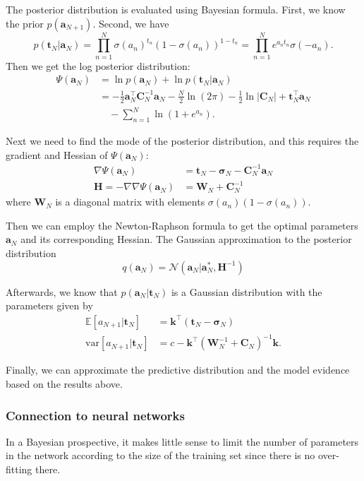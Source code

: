 \documentclass[a4paper]{report}
\newcommand{\up}{\mathrm}
\renewcommand{\bf}{\mathbf}
\renewcommand{\cal}{\mathcal}
\newcommand{\bb}{\mathbb}
\newcommand{\bs}{\boldsymbol}
\begin{document}
The posterior distribution is evaluated using Bayesian formula. First, we know the prior $p(\bf{a}_{N+1})$. Second, we have
\begin{equation}
	p(\bf{t}_N|\bf{a}_N) = \prod_{n=1}^N \sigma(a_n)^{t_n} (1-\sigma(a_n))^{1-t_n} = \prod_{n=1}^N e^{a_n t_n}\sigma(-a_n).
\end{equation}
Then we get the log posterior distribution:
\begin{align}
	\Psi(\bf{a}_N) &= \ln p(\bf{a}_N) + \ln p(\bf{t}_N|\bf{a}_N) \\
	&= -\frac{1}{2} \bf{a}_N^{\intercal} \bf{C}_N^{-1} \bf{a}_N - \frac{N}{2} \ln (2\pi) - \frac{1}{2} \ln |\bf{C}_N| + \bf{t}_N^{\intercal}\bf{a}_N \\
	&\quad  -\sum_{n=1}^N \ln (1+e^{a_n}).
\end{align}

Next we need to find the mode of the posterior distribution, and this requires the gradient and Hessian of $\Psi(\bf{a}_N)$:
\begin{align}
	\nabla \Psi(\bf{a}_N) &= \bf{t}_N - \bs{\sigma}_N - \bf{C}_N^{-1} \bf{a}_N \\
    \bf{H} = -\nabla\nabla \Psi(\bf{a}_N) &=  \bf{W}_N + \bf{C}_N^{-1}
\end{align}
where $\bf{W}_N$ is a diagonal matrix with elements $\sigma(a_n)(1-\sigma(a_n))$.

Then we can employ the Newton-Raphson formula to get the optimal parameters $\bf{a}_N$ and its corresponding Hessian. The Gaussian approximation to the posterior distribution
\begin{equation}
	q(\bf{a}_N) = \cal{N}(\bf{a}_N|\bf{a}_N^*,\bf{H}^{-1})
\end{equation}

Afterwards, we know that $p(\bf{a}_N|\bf{t}_N)$ is a Gaussian distribution with the parameters given by
\begin{align}
	\bb{E}[a_{N+1}|\bf{t}_N] &= \bf{k}^{\intercal} (\bf{t}_N - \bs{\sigma}_N) \\
	\up{var}[a_{N+1}|\bf{t}_N] &= c - \bf{k}^{\intercal} (\bf{W}_N^{-1}+\bf{C}_N)^{-1} \bf{k}.
\end{align}

Finally, we can approximate the predictive distribution and the model evidence based on the results above.

\subsubsection{Connection to neural networks}
In a Bayesian prospective, it makes little sense to limit the number of parameters in the network according to the size of the training set since there is no over-fitting there.
\end{document}
